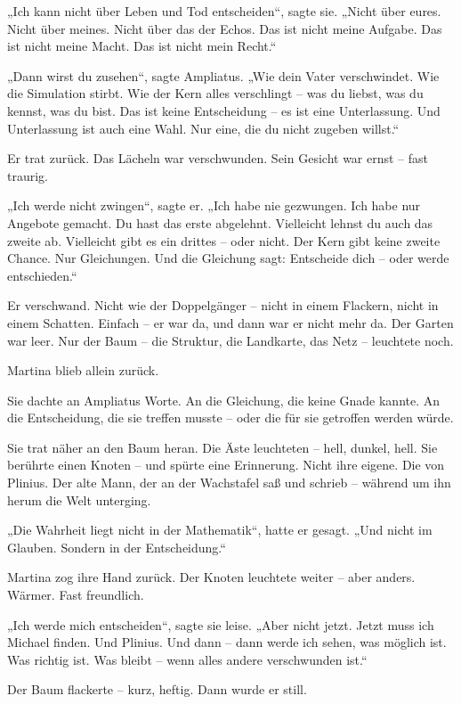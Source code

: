 \documentclass[
]{article}
\begin{document}
„Ich kann nicht über Leben und Tod entscheiden``, sagte sie. „Nicht über eures. Nicht über meines. Nicht über das der Echos. Das ist nicht meine Aufgabe. Das ist nicht meine Macht. Das ist nicht mein Recht.``

„Dann wirst du zusehen``, sagte Ampliatus. „Wie dein Vater verschwindet. Wie die Simulation stirbt. Wie der Kern alles verschlingt -- was du liebst, was du kennst, was du bist. Das ist keine Entscheidung -- es ist eine Unterlassung. Und Unterlassung ist auch eine Wahl. Nur eine, die du nicht zugeben willst.``

Er trat zurück. Das Lächeln war verschwunden. Sein Gesicht war ernst -- fast traurig.

„Ich werde nicht zwingen``, sagte er. „Ich habe nie gezwungen. Ich habe nur Angebote gemacht. Du hast das erste abgelehnt. Vielleicht lehnst du auch das zweite ab. Vielleicht gibt es ein drittes -- oder nicht. Der Kern gibt keine zweite Chance. Nur Gleichungen. Und die Gleichung sagt: Entscheide dich -- oder werde entschieden.``

Er verschwand. Nicht wie der Doppelgänger -- nicht in einem Flackern, nicht in einem Schatten. Einfach -- er war da, und dann war er nicht mehr da. Der Garten war leer. Nur der Baum -- die Struktur, die Landkarte, das Netz -- leuchtete noch.

Martina blieb allein zurück.

Sie dachte an Ampliatus\textquotesingle{} Worte. An die Gleichung, die keine Gnade kannte. An die Entscheidung, die sie treffen musste -- oder die für sie getroffen werden würde.

Sie trat näher an den Baum heran. Die Äste leuchteten -- hell, dunkel, hell. Sie berührte einen Knoten -- und spürte eine Erinnerung. Nicht ihre eigene. Die von Plinius. Der alte Mann, der an der Wachstafel saß und schrieb -- während um ihn herum die Welt unterging.

„Die Wahrheit liegt nicht in der Mathematik``, hatte er gesagt. „Und nicht im Glauben. Sondern in der Entscheidung.``

Martina zog ihre Hand zurück. Der Knoten leuchtete weiter -- aber anders. Wärmer. Fast freundlich.

„Ich werde mich entscheiden``, sagte sie leise. „Aber nicht jetzt. Jetzt muss ich Michael finden. Und Plinius. Und dann -- dann werde ich sehen, was möglich ist. Was richtig ist. Was bleibt -- wenn alles andere verschwunden ist.``

Der Baum flackerte -- kurz, heftig. Dann wurde er still.
\end{document}
